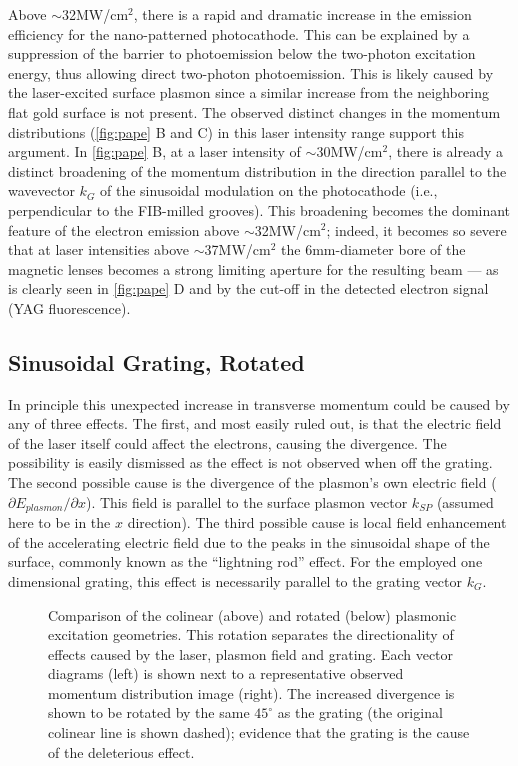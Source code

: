 Above $\sim$32MW/cm$^2$, there is a rapid and dramatic increase in the emission efficiency for the nano-patterned photocathode.
This can be explained by a suppression of the barrier to photoemission below the two-photon excitation energy, thus allowing direct two-photon photoemission.
This is likely caused by the laser-excited surface plasmon since a similar increase from the neighboring flat gold surface is not present.
The observed distinct changes in the momentum distributions (\ref{fig:pape} B and C) in this laser intensity range support this argument.
In \ref{fig:pape} B, at a laser intensity of $\sim$30MW/cm$^2$, there is already a distinct broadening of the momentum distribution in the direction parallel to the wavevector $k_G$ of the sinusoidal modulation on the photocathode (i.e., perpendicular to the FIB-milled grooves). 
This broadening becomes the dominant feature of the electron emission above $\sim$32MW/cm$^2$; indeed, it becomes so severe that at laser intensities above $\sim$37MW/cm$^2$ the 6mm-diameter bore of the magnetic lenses becomes a strong limiting aperture for the resulting beam --- as is clearly seen in \ref{fig:pape} D and by the cut-off in the detected electron signal (YAG fluorescence).

\subsection{Sinusoidal Grating, Rotated}

In principle this unexpected increase in transverse momentum could be caused by any of three effects.
The first, and most easily ruled out, is that the electric field of the laser itself could affect the electrons, causing the divergence.
The possibility is easily dismissed as the effect is not observed when off the grating.
The second possible cause is the divergence of the plasmon's own electric field ($\partial E_{plasmon} / \partial x$).
This field is parallel to the surface plasmon vector $k_{SP}$ (assumed here to be in the $x$ direction).
The third possible cause is local field enhancement of the accelerating electric field due to the peaks in the sinusoidal shape of the surface, commonly known as the ``lightning rod'' effect.
For the employed one dimensional grating, this effect is necessarily parallel to the grating vector $k_G$.

\begin{figure}
  \centering
  
  \caption[Comparison of the colinear and rotated plasmonic excitation geometries]{
    Comparison of the colinear (above) and rotated (below) plasmonic excitation geometries.
    This rotation separates the directionality of effects caused by the laser, plasmon field and grating.
    Each vector diagrams (left) is shown next to a representative observed momentum distribution image (right).
    The increased divergence is shown to be rotated by the same $45^{\circ}$ as the grating (the original colinear line is shown dashed); evidence that the grating is the cause of the deleterious effect.
  }
  \label{fig:rotated}
\end{figure}

